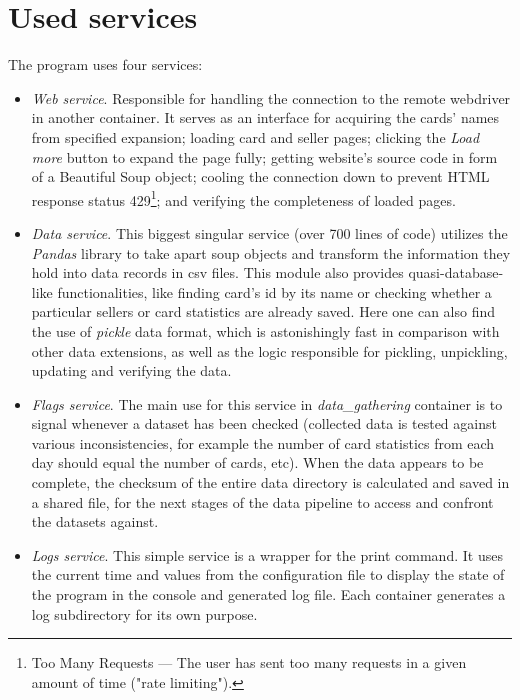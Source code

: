 \section{Used services}
The program uses four services:
\begin{itemize}
      \item \textit{Web service}.
            Responsible for handling the connection to the remote webdriver in another container. It serves as an interface for acquiring the cards' names from specified expansion; loading card and seller pages; clicking the \textit{Load more} button to expand the page fully; getting website's source code in form of a Beautiful Soup object; cooling the connection down to prevent HTML response status 429\footnote{Too  Many Requests --- The user has sent too many requests in a given amount of time ("rate limiting").}; and verifying the completeness of loaded pages.

      \item \textit{Data service}.
            This biggest singular service (over 700 lines of code) utilizes the \textit{Pandas} library to take apart soup objects and transform the information they hold into data records in csv files. This module also provides quasi-database-like functionalities, like finding card's id by its name or checking whether a particular sellers or card statistics are already saved. Here one can also find the use of \textit{pickle} data format, which is astonishingly fast in comparison with other data extensions, as well as the logic responsible for pickling, unpickling, updating and verifying the data.

      \item \textit{Flags service}.
            The main use for this service in \textit{data\_gathering} container is to signal whenever a dataset has been checked (collected data is tested against various inconsistencies, for example the number of card statistics from each day should equal the number of cards, etc). When the data appears to be complete, the checksum of the entire data directory is calculated and saved in a shared file, for the next stages of the data pipeline to access and confront the datasets against.

      \item \textit{Logs service}.
            This simple service is a wrapper for the print command. It uses the current time and values from the configuration file to display the state of the program in the console and generated log file. Each container generates a log subdirectory for its own purpose.
\end{itemize}

